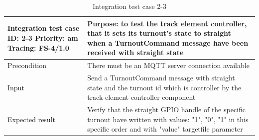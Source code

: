 \begin{table}[H]
	\caption{Integration test case 2-3}
	\label{table:TCase-FSI2-3}
	\begin{center}
		\renewcommand{\arraystretch}{1.8}
		\begin{tabu} 
			to 0.9 \textwidth
			{  X[0.4, c] X[c] }
			\toprule
			Integration test case ID: 2-3 \newline Priority: am \newline Tracing: FS-4/1.0 & Purpose: to test the track element controller, that it sets its turnout's state to straight when a TurnoutCommand message have been received with straight state  \\ \midrule
			Precondition                                                                   & There must be an MQTT server connection available                                                                                                                 \\
			Input                                                                          & Send a TurnoutCommand message with straight state and the turnout id which is controller by the track element controller component                                \\
			Expected result                                                                & Verify that the straight GPIO handle of the specific turnout have written with values: "1", "0", "1" in this specific order and with "value" targetfile parameter \\ \bottomrule
		\end{tabu}
	\end{center}
\end{table} 

